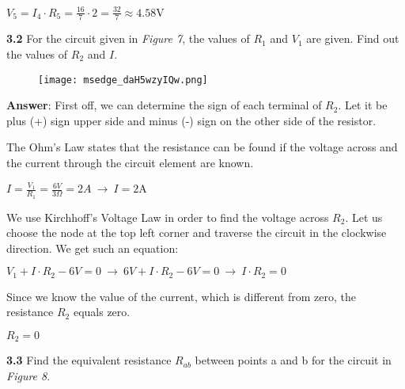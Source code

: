 \documentclass{article}
\begin{document}
{\Large $\displaystyle \boxed{V_5 = I_4\cdot R_5 = \frac{16}{7} \cdot 2 = \frac{32}{7} \approx 4.58 \text{V}}$}

\vspace{8mm}

{\Large \textbf{3.2} For the circuit given in \textit{Figure 7}, the values of $R_{1}$ and $V_{1}$ are given. Find out the values of $R_{2}$ and $I$.}

\begin{figure}[H]
    \centering
    \texttt{[image: msedge\_daH5wzyIQw.png]}
\end{figure}

{\Large \textbf{Answer}: First off, we can determine the sign of each terminal of $R_{2}$. Let it be plus (+) sign upper side and minus (-) sign on the other side of the resistor.}

{\Large The Ohm's Law states that the resistance can be found if the voltage across and the current through the circuit element are known.}

{\vspace{4mm}}

{\Large $\displaystyle I = \frac{V_{1}}{R_{1}} = \frac{6V}{3\Omega} = 2A \ \rightarrow \ \boxed{I = 2\text{A}} $}

{\vspace{4mm}}

{\Large We use Kirchhoff's Voltage Law in order to find the voltage across $R_{2}$. Let us choose the node at the top left corner and traverse the circuit in the clockwise direction. We get such an equation:}

{\vspace{4mm}}

{\Large $V_{1} + I\cdot R_{2} - 6V = 0 \ \rightarrow \ 6V + I\cdot R_{2} - 6V = 0 \ \rightarrow \ I\cdot R_{2} = 0$}

{\vspace{4mm}}

{\Large Since we know the value of the current, which is different from zero, the resistance $R_{2}$ equals zero.}

{\vspace{4mm}}

{\Large $\boxed{R_{2} = 0}$}

{\vspace{8mm}}

\newpage

{\Large \textbf{3.3} Find the equivalent resistance $R_{ab}$ between points a and b for the circuit in \textit{Figure 8}.}
\end{document}
